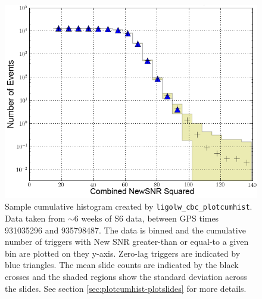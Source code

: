 \begin{figure}[p]
\label{fig:sample_plotcumhist}
\center
\includegraphics[width=5in]{figures/H1L1V1-ligolw_cbc_plotcumhist_FULL_DATA_CAT_4_VETO_cumhist_combined_snr_sq_ALL_DATA_PLOTTED_OPEN_BOX-931035296-4763191.png}
\caption{Sample cumulative histogram created by
\texttt{ligolw\_cbc\_plotcumhist}. Data taken from $\sim6$ weeks of S6 data,
between GPS times 931035296 and 935798487. The data is binned and the
cumulative number of triggers with New SNR greater-than or equal-to a given bin
are plotted on they y-axis. Zero-lag triggers are indicated by blue triangles.
The mean slide counts are indicated by the black crosses and the shaded regions
show the standard deviation across the slides. See section
\ref{sec:plotcumhist-plotslides} for more details.}
\end{figure}

